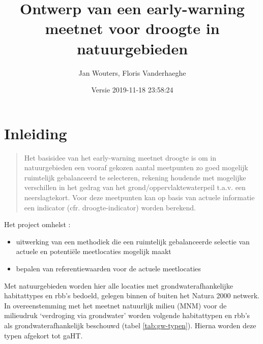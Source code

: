\documentclass[11pt,]{book}
\title{Ontwerp van een early-warning meetnet voor droogte in natuurgebieden}
\author{Jan Wouters, Floris Vanderhaeghe}
\date{Versie 2019-11-18 23:58:24}
\providecommand{\tightlist}{%
  \setlength{\itemsep}{0pt}\setlength{\parskip}{0pt}}
\begin{document}
\maketitle

{
\hypersetup{linkcolor=black}
\setcounter{tocdepth}{2}
\tableofcontents
}
\chapter{Inleiding}\label{inleiding}

\begin{quote}
Het basisidee van het early-warning meetnet droogte is om in
natuurgebieden een vooraf gekozen aantal meetpunten zo goed mogelijk
ruimtelijk gebalanceerd te selecteren, rekening houdende met mogelijke
verschillen in het gedrag van het grond/oppervlaktewaterpeil t.a.v. een
neerslagtekort. Voor deze meetpunten kan op basis van actuele informatie
een indicator (cfr. droogte-indicator) worden berekend.
\end{quote}

Het project omhelst :

\begin{itemize}
\tightlist
\item
  uitwerking van een methodiek die een ruimtelijk gebalanceerde selectie
  van actuele en potentiële meetlocaties mogelijk maakt
\item
  bepalen van referentiewaarden voor de actuele meetlocaties
\end{itemize}

Met natuurgebieden worden hier alle locaties met grondwaterafhankelijke
habitattypes en rbb's bedoeld, gelegen binnen of buiten het Natura 2000
netwerk. In overeenstemming met het meetnet natuurlijk milieu (MNM) voor
de milieudruk `verdroging via grondwater' worden volgende habitattypen
en rbb's als grondwaterafhankelijk beschouwd (tabel \ref{tab:gw-typen}).
Hierna worden deze typen afgekort tot gaHT.
\end{document}
